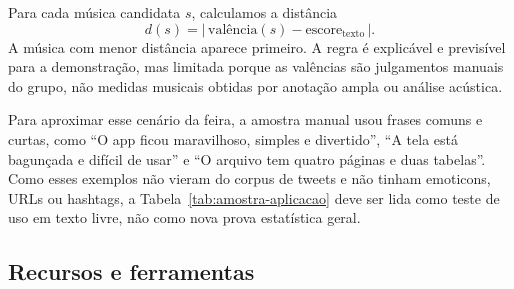 \documentclass[11pt,a4paper]{article}
\newcommand{\altrowcolors}{\rowcolors{2}{black!4}{white}}
\newcommand{\clearrowcolors}{\rowcolors{2}{}{}}
\begin{document}
Para cada música candidata $s$, calculamos a distância
\[
d(s) = |\,\text{valência}(s) - \text{escore}_{\text{texto}}\,|.
\]
A música com menor distância aparece primeiro. A regra é explicável e previsível para a demonstração, mas limitada porque as valências são julgamentos manuais do grupo, não medidas musicais obtidas por anotação ampla ou análise acústica.

Para aproximar esse cenário da feira, a amostra manual usou frases comuns e curtas, como ``O app ficou maravilhoso, simples e divertido'', ``A tela está bagunçada e difícil de usar'' e ``O arquivo tem quatro páginas e duas tabelas''. Como esses exemplos não vieram do corpus de tweets e não tinham emoticons, URLs ou hashtags, a Tabela~\ref{tab:amostra-aplicacao} deve ser lida como teste de uso em texto livre, não como nova prova estatística geral.

\begin{table}[h]
\small
\centering
\renewcommand{\arraystretch}{1.08}
\altrowcolors
{}
\clearrowcolors
\caption{Amostra manual de vinte frases livres usadas para escolher o modo não simbólico da aplicação. A tabela não substitui o benchmark no corpus, mas mostra o comportamento esperado em entradas curtas de demonstração.}
\label{tab:amostra-aplicacao}
\end{table}

\subsection{Recursos e ferramentas}
\end{document}

